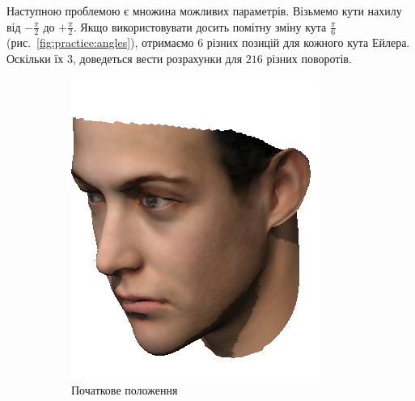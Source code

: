 Наступною проблемою є множина можливих параметрів.
Візьмемо кути нахилу від $-\frac{\pi}{2}$ до $+\frac{\pi}{2}$.
Якщо використовувати досить помітну зміну кута $\frac{\pi}{6}$
(рис.~\ref{fig:practice:angles}),
отримаємо $6$ різних позицій для кожного кута Ейлера.
Оскільки їх $3$, доведеться вести розрахунки для $216$ різних поворотів.
\begin{figure}[h]
  \centering
  \begin{subfigure}[b]{0.3\textwidth}
    \centering
    \includegraphics[width=\textwidth]{images/face_rotated_1}
    \caption{Початкове положення}
  \end{subfigure}
  \begin{subfigure}[b]{0.3\textwidth}
    \centering

\end{subfigure}
\end{figure}
